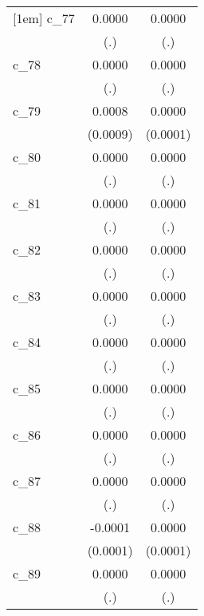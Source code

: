 {\begin{tabular}{l*{2}{c}}
[1em]
c\_77        &      0.0000        &      0.0000        \\
            &         (.)        &         (.)        \\
[1em]
c\_78        &      0.0000        &      0.0000        \\
            &         (.)        &         (.)        \\
[1em]
c\_79        &      0.0008        &      0.0000        \\
            &    (0.0009)        &    (0.0001)        \\
[1em]
c\_80        &      0.0000        &      0.0000        \\
            &         (.)        &         (.)        \\
[1em]
c\_81        &      0.0000        &      0.0000        \\
            &         (.)        &         (.)        \\
[1em]
c\_82        &      0.0000        &      0.0000        \\
            &         (.)        &         (.)        \\
[1em]
c\_83        &      0.0000        &      0.0000        \\
            &         (.)        &         (.)        \\
[1em]
c\_84        &      0.0000        &      0.0000        \\
            &         (.)        &         (.)        \\
[1em]
c\_85        &      0.0000        &      0.0000        \\
            &         (.)        &         (.)        \\
[1em]
c\_86        &      0.0000        &      0.0000        \\
            &         (.)        &         (.)        \\
[1em]
c\_87        &      0.0000        &      0.0000        \\
            &         (.)        &         (.)        \\
[1em]
c\_88        &     -0.0001        &      0.0000        \\
            &    (0.0001)        &    (0.0001)        \\
[1em]
c\_89        &      0.0000        &      0.0000        \\
            &         (.)        &         (.)        \\

\end{tabular}}
